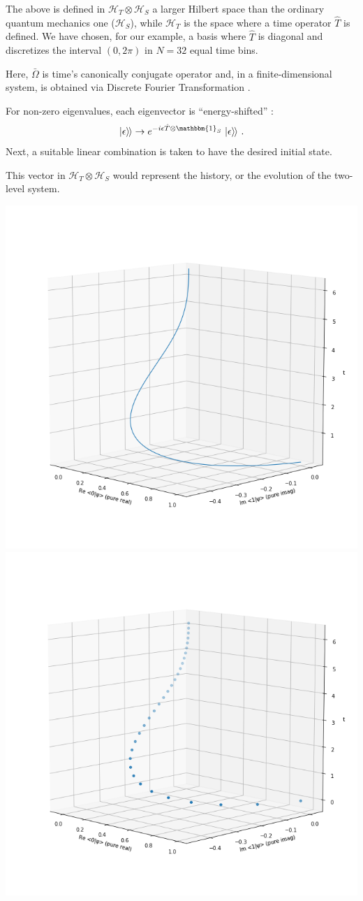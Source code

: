 \documentclass[a0,portrait]{a0poster}
\newcommand{\idop}{\mathbbm{1}}           %
\newcommand{\hilb}[1]{\mathcal{#1}}       %
\newcommand{\ox}{\otimes}
\newcommand{\smallback}{\hspace{-0.115em}}
\newcommand{\dket}[1]{\left.\left| #1 \right\rangle\smallback\right\rangle}
\newcommand{\pwspace}{\hilb{H}_T \ox \hilb{H}_S}
\begin{document}
\begin{multicols}{2}
The above is defined in $\pwspace$ a larger Hilbert space than
the ordinary quantum mechanics one ($\hilb{H}_S$), while $\hilb{H}_T$
is the space where
a time operator $\hat{T}$ is defined. We have chosen, for our example,
a basis where $\hat{T}$
is diagonal and discretizes the interval $(0, 2\pi)$ in $N=32$
equal time bins.

Here, $\bar\Omega$ is time's canonically conjugate operator and,
in a finite-dimensional system, is obtained via Discrete Fourier Transformation
\cite{FiniteHilb}.

For non-zero eigenvalues, each eigenvector
is ``energy-shifted'' \cite{Lloyd:Time}:
\begin{equation}\label{eq:energyfix}
  \dket{\epsilon} \rightarrow e^{-i\epsilon\hat{T} \ox \idop_S} \dket{\epsilon}
  \,\text{.}
\end{equation}
Next, a suitable linear combination is taken to have the desired initial state.

This vector in $\pwspace$ would represent the history, or the evolution of the two-level system.
\begin{center}
  \includegraphics[width=0.45\linewidth]{2ldetect/3D-evol-cont.png}%
  \includegraphics[width=0.45\linewidth]{2ldetect/3D-evol-pw.png}
\end{center}\vspace{0.5cm}


\end{multicols}
\end{document}
